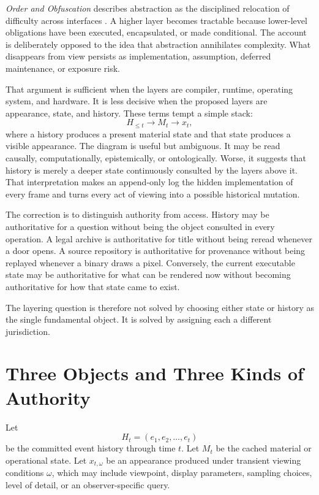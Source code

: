 \documentclass[11pt]{article}
\begin{document}
\emph{Order and Obfuscation} describes abstraction as the disciplined relocation of difficulty across interfaces \cite{flyxion2026order}. A higher layer becomes tractable because lower-level obligations have been executed, encapsulated, or made conditional. The account is deliberately opposed to the idea that abstraction annihilates complexity. What disappears from view persists as implementation, assumption, deferred maintenance, or exposure risk.

That argument is sufficient when the layers are compiler, runtime, operating system, and hardware. It is less decisive when the proposed layers are appearance, state, and history. These terms tempt a simple stack:
\[
H_{\leq t} \longrightarrow M_t \longrightarrow x_t,
\]
where a history produces a present material state and that state produces a visible appearance. The diagram is useful but ambiguous. It may be read causally, computationally, epistemically, or ontologically. Worse, it suggests that history is merely a deeper state continuously consulted by the layers above it. That interpretation makes an append-only log the hidden implementation of every frame and turns every act of viewing into a possible historical mutation.

The correction is to distinguish authority from access. History may be authoritative for a question without being the object consulted in every operation. A legal archive is authoritative for title without being reread whenever a door opens. A source repository is authoritative for provenance without being replayed whenever a binary draws a pixel. Conversely, the current executable state may be authoritative for what can be rendered now without becoming authoritative for how that state came to exist.

The layering question is therefore not solved by choosing either state or history as the single fundamental object. It is solved by assigning each a different jurisdiction.

\section{Three Objects and Three Kinds of Authority}

Let
\[
H_t=(e_1,e_2,\ldots,e_t)
\]
be the committed event history through time $t$. Let $M_t$ be the cached material or operational state. Let $x_{t,\omega}$ be an appearance produced under transient viewing conditions $\omega$, which may include viewpoint, display parameters, sampling choices, level of detail, or an observer-specific query.
\end{document}

